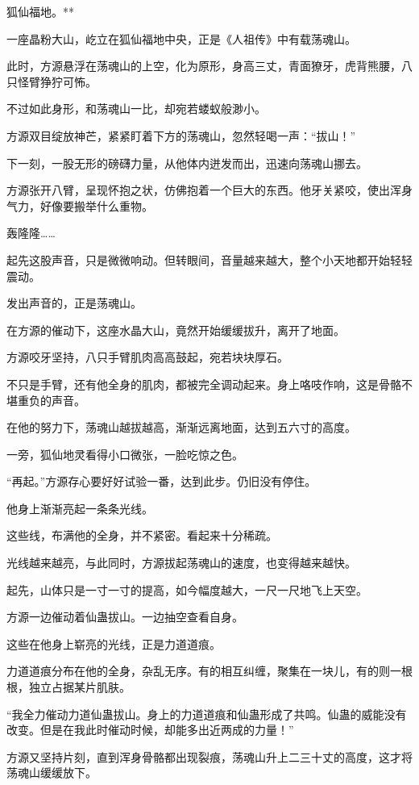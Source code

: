 
\begin{this_body}

狐仙福地。**

一座晶粉大山，屹立在狐仙福地中央，正是《人祖传》中有载荡魂山。

此时，方源悬浮在荡魂山的上空，化为原形，身高三丈，青面獠牙，虎背熊腰，八只怪臂狰狞可怖。

不过如此身形，和荡魂山一比，却宛若蝼蚁般渺小。

方源双目绽放神芒，紧紧盯着下方的荡魂山，忽然轻喝一声：“拔山！”

下一刻，一股无形的磅礴力量，从他体内迸发而出，迅速向荡魂山挪去。

方源张开八臂，呈现怀抱之状，仿佛抱着一个巨大的东西。他牙关紧咬，使出浑身气力，好像要搬举什么重物。

轰隆隆……

起先这股声音，只是微微响动。但转眼间，音量越来越大，整个小天地都开始轻轻震动。

发出声音的，正是荡魂山。

在方源的催动下，这座水晶大山，竟然开始缓缓拔升，离开了地面。

方源咬牙坚持，八只手臂肌肉高高鼓起，宛若块块厚石。

不只是手臂，还有他全身的肌肉，都被完全调动起来。身上咯吱作响，这是骨骼不堪重负的声音。

在他的努力下，荡魂山越拔越高，渐渐远离地面，达到五六寸的高度。

一旁，狐仙地灵看得小口微张，一脸吃惊之色。

“再起。”方源存心要好好试验一番，达到此步。仍旧没有停住。

他身上渐渐亮起一条条光线。

这些线，布满他的全身，并不紧密。看起来十分稀疏。

光线越来越亮，与此同时，方源拔起荡魂山的速度，也变得越来越快。

起先，山体只是一寸一寸的提高，如今幅度越大，一尺一尺地飞上天空。

方源一边催动着仙蛊拔山。一边抽空查看自身。

这些在他身上崭亮的光线，正是力道道痕。

力道道痕分布在他的全身，杂乱无序。有的相互纠缠，聚集在一块儿，有的则一根根，独立占据某片肌肤。

“我全力催动力道仙蛊拔山。身上的力道道痕和仙蛊形成了共鸣。仙蛊的威能没有改变。但是在我此时催动时候，却能多出近两成的力量！”

方源又坚持片刻，直到浑身骨骼都出现裂痕，荡魂山升上二三十丈的高度，这才将荡魂山缓缓放下。


\end{this_body}
